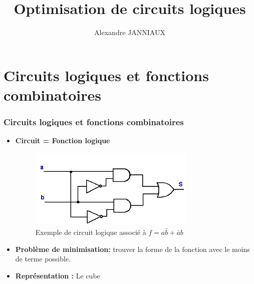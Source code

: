 \documentclass[handout]{beamer}
\title{Optimisation de circuits logiques}
\author{Alexandre JANNIAUX}
\date{}
\begin{document}
\begin{frame}
  \maketitle
  \tableofcontents
\end{frame}

\section{Circuits logiques et fonctions combinatoires}
\begin{frame}
  \frametitle{Circuits logiques et fonctions combinatoires}
  
  \begin{itemize}

   \item \textbf{Circuit = Fonction logique}
   \begin{figure}[p]
   \includegraphics[width=8cm]{circuit_logique2.png}
   \caption{Exemple de circuit logique associé à $f= a\bar{b} + \bar{a}b$ }
   \label{fig:circ1}
  \end{figure}
  \vfill\null

  \item\textbf{Problème de minimisation: } trouver la forme de la fonction avec le moins de terme possible.
  \vfill\null

  \item\textbf{Représentation : } Le cube
  \begin{figure}[b]
  \begin{tikzpicture}[scale=2]
  
  \end{tikzpicture}
  \end{figure}
  \vfill\null

\end{itemize}
  
\end{frame}
\end{document}
